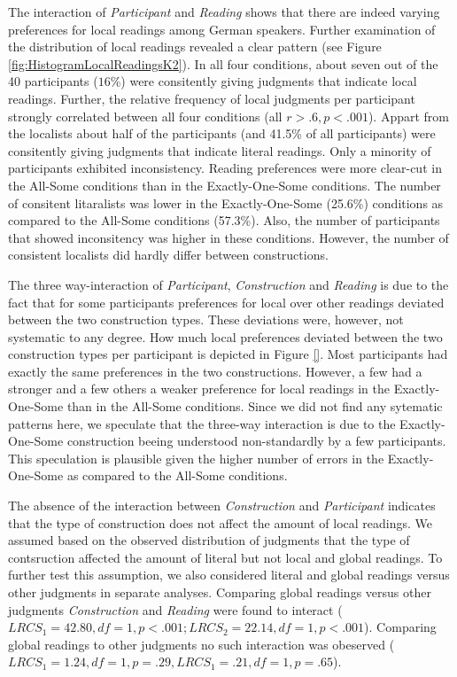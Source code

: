 \documentclass[fleqn,reqno,10pt,draft]{article}
\begin{document}
The interaction of {\it Participant} and {\it Reading} shows that
there are indeed varying preferences for local readings among German
speakers. Further examination of the distribution of local readings
revealed a clear pattern (see Figure
\ref{fig:HistogramLocalReadingsK2}). In all four conditions, about
seven out of the 40 participants ($16\%$) were consitently giving
judgments that indicate local readings. Further, the relative
frequency of local judgments per participant strongly correlated
between all four conditions (all $r>.6, p<.001$). Appart from the
localists about half of the participants (and 41.5\% of all
participants) were consitently giving judgments that indicate literal
readings. Only a minority of participants exhibited
inconsistency. Reading preferences were more clear-cut in the All-Some
conditions than in the Exactly-One-Some conditions. The number of
consitent litaralists was lower in the Exactly-One-Some (25.6\%)
conditions as compared to the All-Some conditions (57.3\%). Also, the
number of participants that showed inconsitency was higher in these
conditions. However, the number of consistent localists did hardly
differ between constructions.

The three way-interaction of {\it Participant}, {\it Construction} and
{\it Reading} is due to the fact that for some participants
preferences for local over other readings deviated between the two
construction types. These deviations were, however, not systematic to
any degree. How much local preferences deviated between the two
construction types per participant is depicted in Figure \ref{}. Most
participants had exactly the same preferences in the two
constructions. However, a few had a stronger and a few others a weaker
preference for local readings in the Exactly-One-Some than in the
All-Some conditions. Since we did not find any sytematic patterns
here, we speculate that the three-way interaction is due to the
Exactly-One-Some construction beeing understood non-standardly by a
few participants. This speculation is plausible given the higher
number of errors in the Exactly-One-Some as compared to the All-Some
conditions.

The absence of the interaction between {\it Construction} and {\it
  Participant} indicates that the type of construction does not affect
the amount of local readings. We assumed based on the observed
distribution of judgments that the type of contsruction affected the
amount of literal but not local and global readings. To further test
this assumption, we also considered literal and global readings versus
other judgments in separate analyses. Comparing global readings versus
other judgments {\it Construction} and {\it Reading} were found to
interact ($LRCS_1=42.80, df= 1, p<.001; LRCS_2=22.14, df= 1,
p<.001$). Comparing global readings to other judgments no such
interaction was obeserved ($LRCS_1=1.24, df= 1, p=.29, LRCS_1=.21, df=
1, p=.65$).
\end{document}
